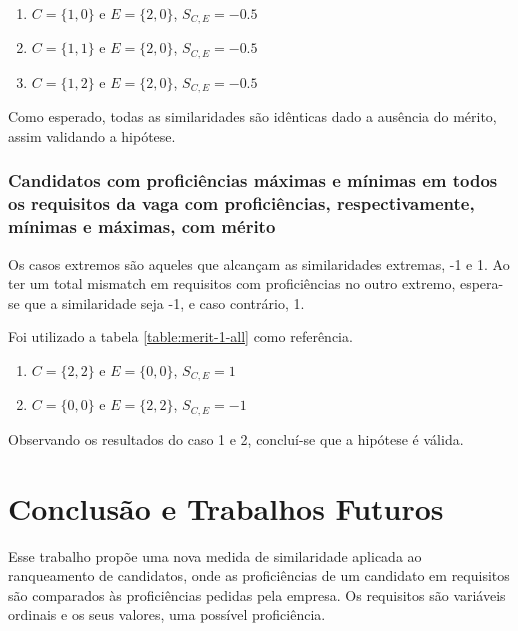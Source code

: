 \documentclass[preprint,12pt]{elsarticle}
\begin{document}
\begin{enumerate}
    \item $C = \{1,0\}$ e $E = \{2,0\}$, $S_{C,E} = -0.5$
    \item $C = \{1,1\}$ e $E = \{2,0\}$, $S_{C,E} = -0.5$
    \item $C = \{1,2\}$ e $E = \{2,0\}$, $S_{C,E} = -0.5$
\end{enumerate}

Como esperado, todas as similaridades são idênticas dado a ausência do mérito, assim validando a hipótese.

\subsubsection{Candidatos com proficiências máximas e mínimas em todos os requisitos da vaga com proficiências, respectivamente, mínimas e máximas, com mérito}

Os casos extremos são aqueles que alcançam as similaridades extremas, -1 e 1. Ao ter um total mismatch em requisitos com proficiências no outro extremo, espera-se que a similaridade seja -1, e caso contrário, 1.

Foi utilizado a tabela \ref{table:merit-1-all} como referência.

\begin{enumerate}
    \item $C = \{2,2\}$ e $E = \{0,0\}$, $S_{C,E} = 1$
    \item $C = \{0,0\}$ e $E = \{2,2\}$, $S_{C,E} = -1$
\end{enumerate}

Observando os resultados do caso 1 e 2, concluí-se que a hipótese é válida.



\section{Conclusão e Trabalhos Futuros}
\label{sec:sample5}

Esse trabalho propõe uma nova medida de similaridade aplicada ao ranqueamento de candidatos, onde as proficiências de um candidato em requisitos são comparados às proficiências pedidas pela empresa. Os requisitos são variáveis ordinais e os seus valores, uma possível proficiência. 
\end{document}
